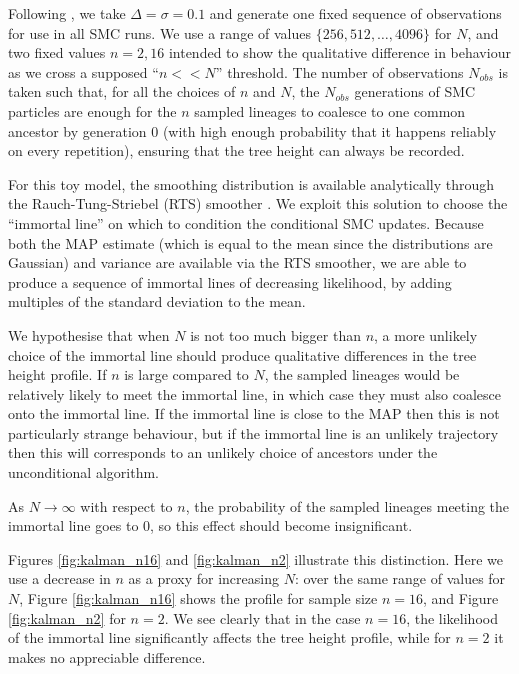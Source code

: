 \documentclass{article}
\begin{document}
Following \citet{koskela2018}, we take $\Delta = \sigma = 0.1$ and generate one fixed sequence of observations for use in all SMC runs.
We use a range of values $\{256, 512, \dots, 4096\}$ for $N$, and two fixed values $n=2,16$ intended to show the qualitative difference in behaviour as we cross a supposed ``$n<<N$'' threshold.
The number of observations $N_{obs}$ is taken such that, for all the choices of $n$ and $N$, the $N_{obs}$ generations of SMC particles are enough for the $n$ sampled lineages to coalesce to one common ancestor by generation 0 (with high enough probability that it happens reliably on every repetition), ensuring that the tree height can always be recorded.

For this toy model, the smoothing distribution is available analytically through the Rauch-Tung-Striebel (RTS) smoother \citep{rauch1965}. We exploit this solution to choose the ``immortal line'' on which to condition the conditional SMC updates. Because both the MAP estimate (which is equal to the mean since the distributions are Gaussian) and variance are available via the RTS smoother, we are able to produce a sequence of immortal lines of decreasing likelihood, by adding multiples of the standard deviation to the mean.

We hypothesise that when $N$ is not too much bigger than $n$, a more unlikely choice of the immortal line should produce qualitative differences in the tree height profile. If $n$ is large compared to $N$, the sampled lineages would be relatively likely to meet the immortal line, in which case they must also coalesce onto the immortal line. If the immortal line is close to the MAP then this is not particularly strange behaviour, but if the immortal line is an unlikely trajectory then this will corresponds to an unlikely choice of ancestors under the unconditional algorithm. 

As $N\to\infty$ with respect to $n$, the probability of the sampled lineages meeting the immortal line goes to 0, so this effect should become insignificant.

Figures \ref{fig:kalman_n16} and \ref{fig:kalman_n2} illustrate this distinction. Here we use a decrease in $n$ as a proxy for increasing $N$: over the same range of values for $N$, Figure \ref{fig:kalman_n16} shows the profile for sample size $n=16$, and Figure \ref{fig:kalman_n2} for $n=2$.
We see clearly that in the case $n=16$, the likelihood of the immortal line significantly affects the tree height profile, while for $n=2$ it makes no appreciable difference.
\end{document}

